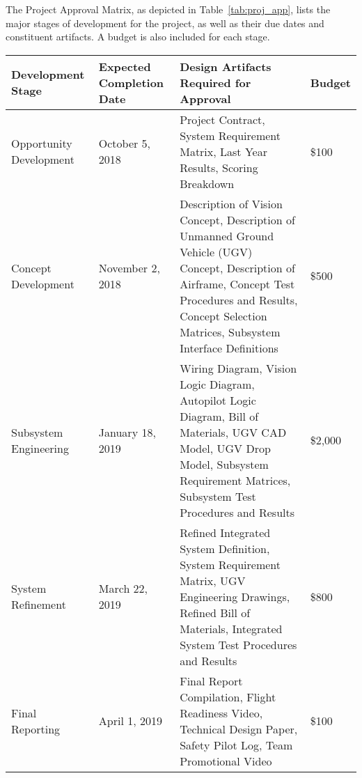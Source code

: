 

The Project Approval Matrix, as depicted in Table~\ref{tab:proj_app}, lists the major stages of development for the project, as well as their due dates and constituent artifacts. A budget is also included for each stage. 

\newpage
\begin{center}
\label{tab:proj_app}
\begin{tabular}{|p{4cm}|p{3.5cm}|p{5.4cm}|p{1.5cm}|}
 \hline	
\rowcolor[HTML]{C0C0C0}	
{\color[HTML]{000000} \textbf{Development Stage}} & {\color[HTML]{000000} \textbf{Expected Completion Date}} & {\color[HTML]{000000} \textbf{Design Artifacts Required for Approval}} & {\color[HTML]{000000} \textbf{Budget}}\\ \hline	
Opportunity Development & October 5, 2018 & Project Contract, System Requirement Matrix, Last Year Results, Scoring Breakdown & \$100 \\ \hline	
Concept Development & November 2, 2018 & Description of Vision Concept, Description of Unmanned Ground Vehicle (UGV) Concept, Description of Airframe, Concept Test Procedures and Results, Concept Selection Matrices, Subsystem Interface Definitions & \$500 \\ \hline	
Subsystem Engineering & January 18, 2019 & Wiring Diagram, Vision Logic Diagram, Autopilot Logic Diagram, Bill of Materials, UGV CAD Model, UGV Drop Model, Subsystem Requirement Matrices, Subsystem Test Procedures and Results & \$2,000\\ \hline	
System Refinement & March 22, 2019 & Refined Integrated System Definition, System Requirement Matrix, UGV Engineering Drawings, Refined Bill of Materials, Integrated System Test Procedures and Results & \$800\\ \hline	
Final Reporting & April 1, 2019 & Final Report Compilation, Flight Readiness Video, Technical Design Paper, Safety Pilot Log, Team Promotional Video & \$100 \\ \hline	

  \hline  
\end{tabular}

\end{center}

